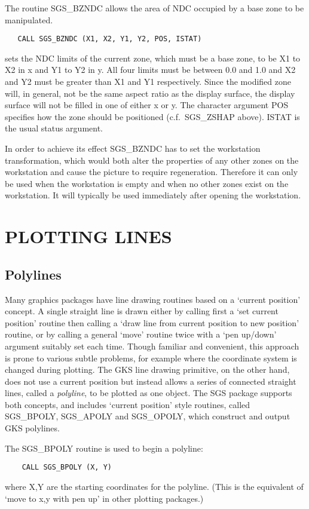 The routine SGS\_BZNDC allows the area of NDC occupied by a base zone to
be manipulated.
\begin{verbatim}
   CALL SGS_BZNDC (X1, X2, Y1, Y2, POS, ISTAT)
\end{verbatim}
sets the NDC limits of the current zone, which must be a base zone, to be X1 to
X2 in x and Y1 to Y2 in y. All four limits must be between 0.0 and 1.0 and X2
and Y2 must be greater than X1 and Y1 respectively. Since the modified zone
will, in general, not be the same aspect ratio as the display surface, the
display surface will not be filled in one of either x or y. The character
argument POS specifies how the zone should be positioned (c.f.\ SGS\_ZSHAP
above). ISTAT is the usual status argument. 

In order to achieve its effect SGS\_BZNDC has to set the workstation
transformation, which would both alter the properties of any other zones
on the workstation and cause the picture to require regeneration. Therefore
it can only be used when the workstation is empty and when no other zones
exist on the workstation. It will typically be used immediately after opening
the workstation.

\section {PLOTTING LINES}\label{sec-lines}

\subsection {Polylines}
Many graphics packages have line drawing routines based on a
`current position' concept.  A single straight line
is drawn either by calling first a `set current position' routine
then calling a `draw line from current position to new
position' routine, or by calling a general `move' routine
twice with a `pen up/down' argument suitably set each time.  Though
familiar and convenient, this approach is prone to various
subtle problems, for example where the coordinate system is
changed during plotting.  The
GKS line drawing primitive,
on the other hand, does not use a current position but instead
allows a series of connected
straight lines, called a {\em polyline},
to be plotted as one object.  The SGS package supports both
concepts, and includes `current position' style routines,
called SGS\_BPOLY, SGS\_APOLY and SGS\_OPOLY,
which construct and output GKS polylines.

The SGS\_BPOLY
routine is used to begin a polyline:
\begin{verbatim}
    CALL SGS_BPOLY (X, Y)
\end{verbatim}
where X,Y are the starting coordinates for the polyline.  (This
is the equivalent of `move to x,y with pen up' in other
plotting packages.)

